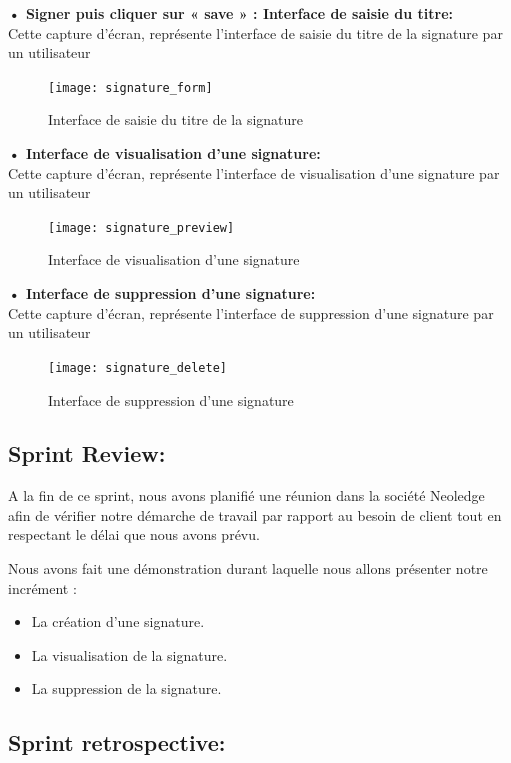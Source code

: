 \textbf{•	Signer puis cliquer sur « save » : Interface de saisie du titre:}\\
Cette capture d'écran, représente l'interface de saisie du titre de la signature par un utilisateur
\begin{figure}[H]
  \centering
  \texttt{[image: signature\_form]}
  \caption{Interface de saisie du titre de la signature}
  \label{fig:signature_title}
\end{figure}

\textbf{•	Interface de visualisation d'une signature:}\\
Cette capture d'écran, représente l'interface de visualisation d'une signature par un utilisateur

\begin{figure}[H]
  \centering
  \texttt{[image: signature\_preview]}
  \caption{Interface de visualisation d'une signature}
  \label{fig:signature_view}
\end{figure}

\textbf{•	Interface de suppression d'une signature:}\\
Cette capture d'écran, représente l'interface de suppression d'une signature par un utilisateur

\begin{figure}[h!]
  \centering
  \texttt{[image: signature\_delete]}
  \caption{Interface de suppression d'une signature}
  \label{fig:signature_delete}
\end{figure}



\subsection{Sprint Review:}
A la fin de ce sprint, nous avons planifié une réunion dans la société Neoledge afin de vérifier notre démarche de travail par rapport au besoin de client tout en respectant le délai que nous avons prévu.

Nous avons fait une démonstration durant laquelle nous allons présenter notre incrément :

\begin{itemize}
  \item La création d'une signature.
  \item La visualisation de la signature.
  \item La suppression de la signature.
\end{itemize}

\subsection{Sprint retrospective:}

